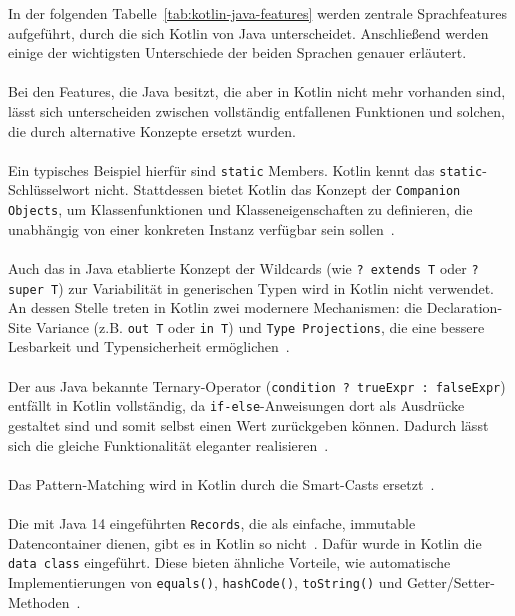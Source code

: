 \documentclass[11pt]{article}
\begin{document}
    In der folgenden Tabelle~\ref{tab:kotlin-java-features} werden zentrale Sprachfeatures aufgeführt, durch die sich Kotlin von Java unterscheidet.
    Anschließend werden einige der wichtigsten Unterschiede der beiden Sprachen genauer erläutert.\\
    \\
    Bei den Features, die Java besitzt, die aber in Kotlin nicht mehr vorhanden sind, lässt sich unterscheiden zwischen vollständig entfallenen Funktionen und solchen, die durch alternative Konzepte ersetzt wurden.\\
    \\
    Ein typisches Beispiel hierfür sind \texttt{static} Members.
    Kotlin kennt das \texttt{static}-Schlüsselwort nicht.
    Stattdessen bietet Kotlin das Konzept der \texttt{Companion Objects}, um Klassenfunktionen und Klasseneigenschaften zu definieren, die unabhängig von einer konkreten Instanz verfügbar sein sollen~\cite{kotlin-static-members}.\\
    \\
    Auch das in Java etablierte Konzept der Wildcards (wie \texttt{? extends T} oder \texttt{? super T}) zur Variabilität in generischen Typen wird in Kotlin nicht verwendet.
    An dessen Stelle treten in Kotlin zwei modernere Mechanismen: die Declaration-Site Variance (z.B. \texttt{out T} oder \texttt{in T}) und \texttt{Type Projections}, die eine bessere Lesbarkeit und Typensicherheit ermöglichen~\cite{doc-comparison}.\\
    \\
    Der aus Java bekannte Ternary-Operator (\texttt{condition ? trueExpr : falseExpr}) entfällt in Kotlin vollständig, da \texttt{if-else}-Anweisungen dort als Ausdrücke gestaltet sind und somit selbst einen Wert zurückgeben können.
    Dadurch lässt sich die gleiche Funktionalität eleganter realisieren~\cite{doc-comparison}.\\
    \\
    Das Pattern-Matching wird in Kotlin durch die Smart-Casts ersetzt~\cite{doc-comparison}.\\
    \\
    Die mit Java 14 eingeführten \texttt{Records}, die als einfache, immutable Datencontainer dienen, gibt es in Kotlin so nicht~\cite{jdk-record}.
    Dafür wurde in Kotlin die \texttt{data class} eingeführt.
    Diese bieten ähnliche Vorteile, wie automatische Implementierungen von \texttt{equals()}, \texttt{hashCode()}, \texttt{toString()} und Getter/Setter-Methoden~\cite{kotlin-data-class}.\\
\end{document}

